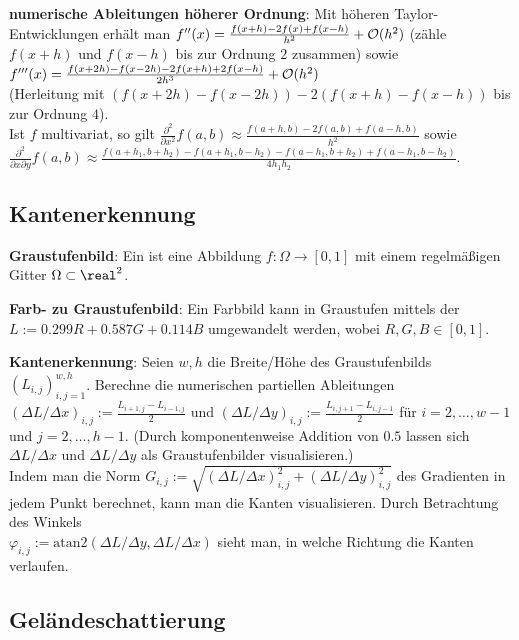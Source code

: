 \linie

\textbf{numerische Ableitungen höherer Ordnung}:
Mit höheren Taylor-Entwicklungen erhält man
$f''(x) = \frac{f(x + h) - 2f(x) + f(x - h)}{h^2} + \mathcal{O}(h^2)$
(zähle $f(x + h)$ und $f(x - h)$ bis zur Ordnung $2$ zusammen) sowie
$f'''(x) = \frac{f(x + 2h) - f(x - 2h) - 2f(x + h) + 2f(x - h)}{2h^3} + \mathcal{O}(h^2)$\\
(Herleitung mit $(f(x+2h)-f(x-2h))-2(f(x+h)-f(x-h))$ bis zur Ordnung $4$).\\
Ist $f$ multivariat, so gilt
$\frac{\partial^2}{\partial x^2} f(a, b) \approx \frac{f(a+h, b) - 2f(a, b) + f(a-h, b)}{h^2}$
sowie\\
$\frac{\partial^2}{\partial x \partial y} f(a, b) \approx
\frac{f(a+h_1, b+h_2) - f(a+h_1, b-h_2) - f(a-h_1, b+h_2) + f(a-h_1, b-h_2)}{4h_1h_2}$.

\pagebreak

\subsection{%
    Kantenerkennung%
}

\textbf{Graustufenbild}:
Ein  ist eine Abbildung $f\colon \Omega \to [0, 1]$ mit
einem regelmäßigen Gitter $\Omega \subset \real^2$.

\textbf{Farb- zu Graustufenbild}:
Ein Farbbild kann in Graustufen mittels der 
$L := 0.299R + 0.587G + 0.114B$ umgewandelt werden,
wobei $R, G, B \in [0, 1]$.

\linie

\textbf{Kantenerkennung}:
Seien $w, h$ die Breite/Höhe des Graustufenbilds $(L_{i,j})_{i,j=1}^{w,h}$.
Berechne die numerischen partiellen Ableitungen
$(\Delta L/\Delta x)_{i,j} := \frac{L_{i+1,j} - L_{i-1,j}}{2}$ und
$(\Delta L/\Delta y)_{i,j} := \frac{L_{i,j+1} - L_{i,j-1}}{2}$
für $i = 2, \dotsc, w - 1$ und $j = 2, \dotsc, h - 1$.
(Durch komponentenweise Addition von $0.5$ lassen sich $\Delta L/\Delta x$ und $\Delta L/\Delta y$
als Graustufenbilder visualisieren.)\\
Indem man die Norm
$G_{i,j} := \sqrt{(\Delta L/\Delta x)_{i,j}^2 + (\Delta L/\Delta y)_{i,j}^2}$
des Gradienten in jedem Punkt berechnet, kann man die Kanten visualisieren.
Durch Betrachtung des Winkels\\
$\varphi_{i,j} := \mathrm{atan2}(\Delta L/\Delta y, \Delta L/\Delta x)$
sieht man, in welche Richtung die Kanten verlaufen.

\subsection{%
    Geländeschattierung%
}

